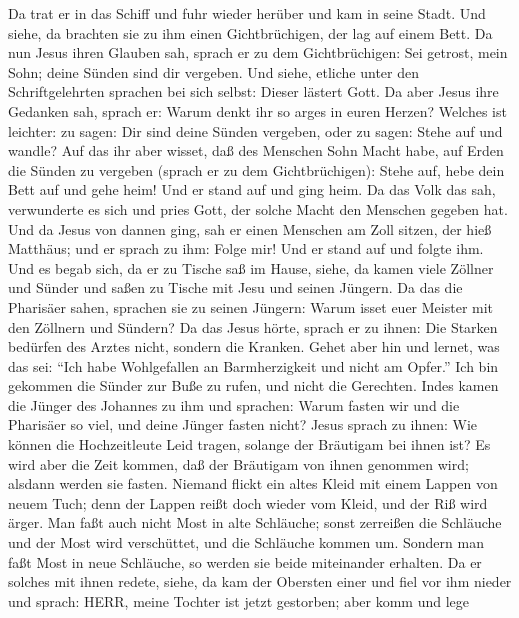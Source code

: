  Da trat er in das Schiff und fuhr wieder herüber und kam in
seine Stadt.  Und siehe, da brachten sie zu ihm einen
Gichtbrüchigen, der lag auf einem Bett. Da nun Jesus ihren Glauben sah,
sprach er zu dem Gichtbrüchigen: Sei getrost, mein Sohn; deine Sünden
sind dir vergeben.  Und siehe, etliche unter den
Schriftgelehrten sprachen bei sich selbst: Dieser lästert Gott.
 Da aber Jesus ihre Gedanken sah, sprach er: Warum denkt ihr
so arges in euren Herzen?  Welches ist leichter: zu sagen:
Dir sind deine Sünden vergeben, oder zu sagen: Stehe auf und wandle?
 Auf das ihr aber wisset, daß des Menschen Sohn Macht habe,
auf Erden die Sünden zu vergeben (sprach er zu dem Gichtbrüchigen):
Stehe auf, hebe dein Bett auf und gehe heim!  Und er stand
auf und ging heim.  Da das Volk das sah, verwunderte es sich
und pries Gott, der solche Macht den Menschen gegeben hat. 
Und da Jesus von dannen ging, sah er einen Menschen am Zoll sitzen, der
hieß Matthäus; und er sprach zu ihm: Folge mir! Und er stand auf und
folgte ihm.  Und es begab sich, da er zu Tische saß im
Hause, siehe, da kamen viele Zöllner und Sünder und saßen zu Tische mit
Jesu und seinen Jüngern.  Da das die Pharisäer sahen,
sprachen sie zu seinen Jüngern: Warum isset euer Meister mit den
Zöllnern und Sündern?  Da das Jesus hörte, sprach er zu
ihnen: Die Starken bedürfen des Arztes nicht, sondern die Kranken.
 Gehet aber hin und lernet, was das sei: ``Ich habe
Wohlgefallen an Barmherzigkeit und nicht am Opfer.'' Ich bin gekommen
die Sünder zur Buße zu rufen, und nicht die Gerechten. 
Indes kamen die Jünger des Johannes zu ihm und sprachen: Warum fasten
wir und die Pharisäer so viel, und deine Jünger fasten nicht?
 Jesus sprach zu ihnen: Wie können die Hochzeitleute Leid
tragen, solange der Bräutigam bei ihnen ist? Es wird aber die Zeit
kommen, daß der Bräutigam von ihnen genommen wird; alsdann werden sie
fasten.  Niemand flickt ein altes Kleid mit einem Lappen
von neuem Tuch; denn der Lappen reißt doch wieder vom Kleid, und der Riß
wird ärger.  Man faßt auch nicht Most in alte Schläuche;
sonst zerreißen die Schläuche und der Most wird verschüttet, und die
Schläuche kommen um. Sondern man faßt Most in neue Schläuche, so werden
sie beide miteinander erhalten.  Da er solches mit ihnen
redete, siehe, da kam der Obersten einer und fiel vor ihm nieder und
sprach: HERR, meine Tochter ist jetzt gestorben; aber komm und lege
